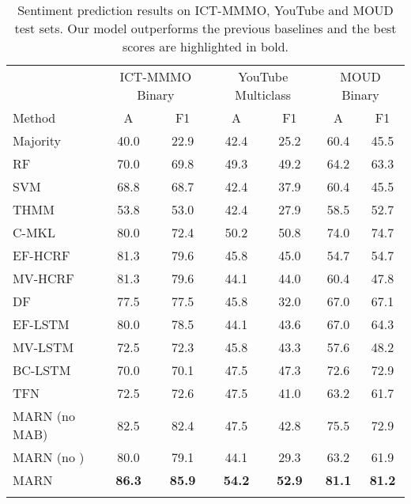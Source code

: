 \documentclass[letterpaper]{article} \usepackage{aaai18}  \usepackage{times}  \usepackage{helvet}  \usepackage{courier}  \usepackage{url}  \usepackage{graphicx}  \usepackage{multirow}
\newcommand{\pipelines}{MARN}
\begin{document}
\begin{table}[tb]
\fontsize{7}{10}\selectfont
\centering
\setlength\tabcolsep{3pt}
\begin{tabular}{l c c c c c c}
\Xhline{3\arrayrulewidth}
& \multicolumn{2}{c}{{ICT-MMMO Binary}} & \multicolumn{2}{c}{{YouTube Multiclass}} & \multicolumn{2}{c}{{MOUD Binary}} \\
 \cmidrule(lr{.5em}){2-3}  \cmidrule(lr{.5em}){4-5} \cmidrule(lr{.5em}){6-7} 
Method        	& A & F1 & A & F1 & A & F1 \\ \Xhline{0.5\arrayrulewidth}
Majority		& 40.0 & 22.9 & 42.4 & 25.2 & 60.4 & 45.5\\
RF				& 70.0 & 69.8 & 49.3 & 49.2 & 64.2 & 63.3\\
SVM     		& 68.8 & 68.7 & 42.4 & 37.9 & 60.4 & 45.5\\
THMM			& 53.8	& 53.0 & 42.4 & 27.9 & 58.5 & 52.7\\
C-MKL			& 80.0 & 72.4 & 50.2 & 50.8 & 74.0 & 74.7 \\
EF-HCRF	& 81.3 & 79.6 & 45.8 & 45.0 & 54.7 & 54.7 \\
MV-HCRF	& 81.3 & 79.6 & 44.1 & 44.0	& 60.4 & 47.8 \\
DF   			&  77.5	&	77.5 & 45.8 & 32.0 & 67.0 & 67.1 \\
EF-LSTM	& 80.0 & 78.5 & 44.1 & 43.6 & 67.0 & 64.3 \\
MV-LSTM			& 72.5 & 72.3  & 45.8 & 43.3 & 57.6 & 48.2 \\
BC-LSTM    		& 70.0	&	70.1 & 47.5 & 47.3 & 72.6 & 72.9 \\ 
TFN      		& 72.5	&	72.6 & 47.5	& 41.0 & 63.2 & 61.7 \\ \Xhline{0.5\arrayrulewidth}
{\pipelines } (no MAB)	& 82.5 & 82.4 & 47.5 & 42.8 & 75.5 & 72.9 \\ 
{\pipelines } (no )  & 80.0 & 79.1 & 44.1 & 29.3 & 63.2 & 61.9 \\
{\pipelines }	&  \textbf{86.3} & \textbf{85.9} & \textbf{54.2} & \textbf{52.9} & \textbf{81.1} & \textbf{81.2} \\ \Xhline{3\arrayrulewidth}
\end{tabular}
\caption{Sentiment prediction results on ICT-MMMO, YouTube and MOUD test sets. Our model outperforms the previous baselines and the best scores are highlighted in bold.}
\label{table:mmmo+you+moud}
\end{table}
\end{document}
